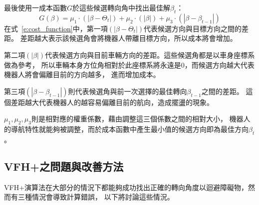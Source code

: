 最後使用一成本函數$G$於這些候選轉向角中找出最佳解$\beta_t$：
\begin{equation}
	G(\beta) = \mu_1\cdot(|\beta - \Theta_t|) + \mu_2\cdot(|\beta|) + \mu_3\cdot(|\beta - \beta_{t-1}|)
	\label{e:cost_function}
\end{equation}
在式~\ref{e:cost_function}中，第一項$(|\beta - \Theta_t|)$代表候選方向與目標方向之間的差距。
差距越大表示該候選角會將機器人帶離目標方向，所以成本將會增加。

第二項$(|\beta|)$代表候選方向與目前車輛方向的差距。這些候選角都是以車身座標系做為參考，
所以車輛本身方位角相對於此座標系將永遠是$0$，而候選方向越大代表機器人將會偏離目前的方向越多，
進而增加成本。

第三項$(|\beta - \beta_{t-1}|)$則代表候選角與前一次選擇的最佳轉向$\beta_{t-1}$之間的差距。
這個差距越大代表機器人的越容易偏離目前的航向，造成擺盪的現象。

$\mu_1,\mu_2,\mu_3$則是相對應的權重係數，藉由調整這三個係數之間的相對大小，
機器人的導航特性就能夠被調整，而於成本函數中產生最小值的候選方向即為最佳方向$\beta_t$。

\subsection{VFH+之問題與改善方法}
\label{subsec:problem}
VFH+演算法在大部分的情況下都能夠成功找出正確的轉向角度以迴避障礙物，然而有三種情況會導致計算錯誤，
以下將討論這些情況。

